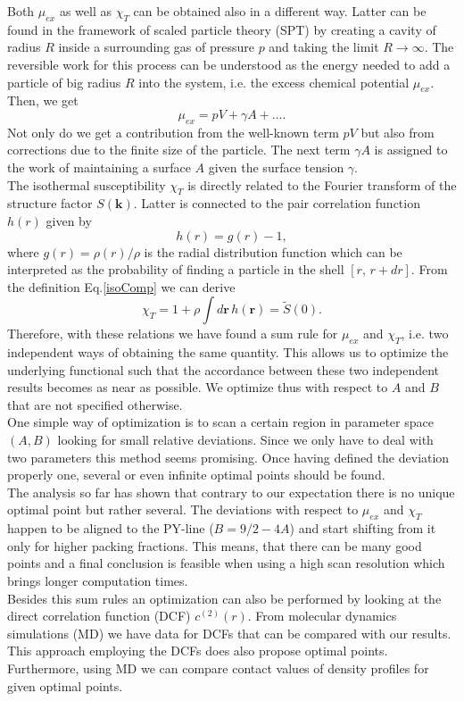 \documentclass{article}
\begin{document}
Both $\mu_{ex}$ as well as $\chi_T$ can be obtained also in a different way. Latter can be found in the framework of scaled particle theory (SPT) by creating a cavity of radius $R$ inside a surrounding gas of pressure $p$ and taking the limit $R\rightarrow\infty$. The reversible work for this process can be understood as the energy needed to add a particle of big radius $R$ into the system, i.e. the excess chemical potential $\mu_{ex}$. Then, we get
\begin{equation}
	\mu_{ex} = pV + \gamma A + \dots.
\end{equation}
Not only do we get a contribution from the well-known term $pV$ but also from corrections due to the finite size of the particle. The next term $\gamma A$ is assigned to the work of maintaining a surface $A$ given the surface tension $\gamma$.\\
The isothermal susceptibility $\chi_T$ is directly related to the Fourier transform of the structure factor $S(\mathbf{k})$. Latter is connected to the pair correlation function $h(r)$ given by
\begin{equation}
	h(r) = g(r)-1,
\end{equation} 
where $g(r)=\rho(r)/\rho$ is the radial distribution function which can be interpreted as the probability of finding a particle in the shell $[r,\,r+dr]$. From the definition Eq.\eqref{isoComp} we can derive
\begin{equation}
	\chi_T = 1+\rho\int d\mathbf{r}\,h(\mathbf{r}) = \tilde{S}(0).
\end{equation}
Therefore, with these relations we have found a sum rule for $\mu_{ex}$ and $\chi_T$, i.e. two independent ways of obtaining the same quantity. This allows us to optimize the underlying functional such that the accordance between these two independent results becomes as near as possible. We optimize thus with respect to $A$ and $B$ that are not specified otherwise.\\
One simple way of optimization is to scan a certain region in parameter space $(A, B)$ looking for small relative deviations. Since we only have to deal with two parameters this method seems promising. Once having defined the deviation properly one, several or even infinite optimal points should be found.\\
The analysis so far has shown that contrary to our expectation there is no unique optimal point but rather several. The deviations with respect to $\mu_{ex}$ and $\chi_T$ happen to be aligned to the PY-line ($B = 9/2-4A$) and start shifting from it only for higher packing fractions. This means, that there can be many good points and a final conclusion is feasible when using a high scan resolution which brings longer computation times.\\
Besides this sum rules an optimization can also be performed by looking at the direct correlation function (DCF) $c^{(2)}(r)$. From molecular dynamics simulations (MD) we have data for DCFs that can be compared with our results. This approach employing the DCFs does also propose optimal points.\\
Furthermore, using MD we can compare contact values of density profiles for given optimal points. 
 
\end{document}
